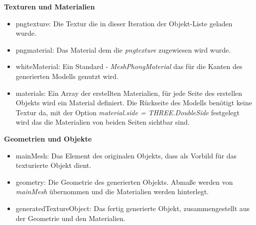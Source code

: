 \textbf{Texturen und Materialien}
\begin{itemize}
    \item png\textunderscore texture: Die Textur die in dieser Iteration der Objekt-Liste geladen wurde.
    \item png\textunderscore material: Das Material dem die \textit{png\textunderscore texture} zugewiesen wird wurde.
    \item whiteMaterial: Ein Standard - \textit{MeshPhongMaterial} das für die Kanten des generierten Modells genutzt wird.
    \item materials: Ein Array der erstellten Materialien, für jede Seite des erstellen Objekts wird ein Material definiert. Die Rückseite des Modells benötigt keine Textur da, mit der Option \textit{material.side = THREE.DoubleSide} festgelegt wird das die Materialien von beiden Seiten sichtbar sind.
\end{itemize}
\textbf{Geometrien und Objekte}
\begin{itemize}
    \item mainMesh: Das Element des originalen Objekts, dass als Vorbild für das texturierte Objekt dient.
    \item geometry: Die Geometrie des generierten Objekts. Abmaße werden von \textit{mainMesh} übernommen und die Materialien werden hinterlegt.
    \item generatedTextureObject: Das fertig generierte Objekt, zusammengestellt aus der Geometrie und den Materialien.
\end{itemize}
\newpage
